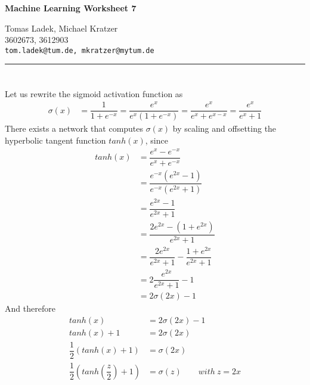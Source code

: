 \documentclass[11pt]{article}
\makeatletter
\newcommand{\exercise}{\section{}}
\newcommand{\hwhead}[4]{
\begin{center}
\sffamily\large\bfseries Machine Learning Worksheet #1
\vspace{2mm}
\normalfont

#2\\
#3\\
\texttt{#4}
\end{center}
\vspace{6mm} \hrule \vspace{4mm}
}
\newcommand{\names}{Tomas Ladek, Michael Kratzer} %
\newcommand{\imats}{3602673, 3612903} %
\newcommand{\emails}{tom.ladek@tum.de, mkratzer@mytum.de} %
\makeatother
\begin{document}
\hwhead{7}{\names}{\imats}{\emails}


\exercise
Let us rewrite the sigmoid activation function as
\begin{align*}
	\sigma(x) &= \dfrac{1}{1 + e^{-x}} = \dfrac{e^x}{e^x (1 + e^{-x})} = \dfrac{e^x}{e^x + e^{x-x}} = \dfrac{e^x}{e^x + 1}
\end{align*}
There exists a network that computes $\sigma(x)$ by scaling and offsetting the hyperbolic tangent function $tanh(x)$, since
\begin{align*}
	tanh(x) &= \dfrac{e^x - e^{-x}}{e^x + e^{-x}} \\
	&= \dfrac{e^{-x} (e^{2x} - 1)}{e^{-x} (e^{2x} + 1)} \\
	&= \dfrac{e^{2x} - 1}{e^{2x} + 1} \\
	&= \dfrac{2e^{2x} - (1 + e^{2x})}{e^{2x} + 1} \\
	&= \dfrac{2e^{2x}}{e^{2x} + 1} - \dfrac{1 + e^{2x}}{e^{2x} + 1}\\
	&= 2 \dfrac{e^{2x}}{e^{2x} + 1} - 1\\
	&= 2 \sigma(2x) - 1
\end{align*}
And therefore
\begin{align*}
	tanh(x) &= 2 \sigma(2x) - 1\\
	tanh(x) + 1 &= 2 \sigma(2x)\\
	\dfrac{1}{2} (tanh(x) + 1) &= \sigma(2x)\\
	\dfrac{1}{2} (tanh(\dfrac{z}{2}) + 1) &= \sigma(z) \quad\quad with\ z = 2x	
\end{align*}
\end{document}
